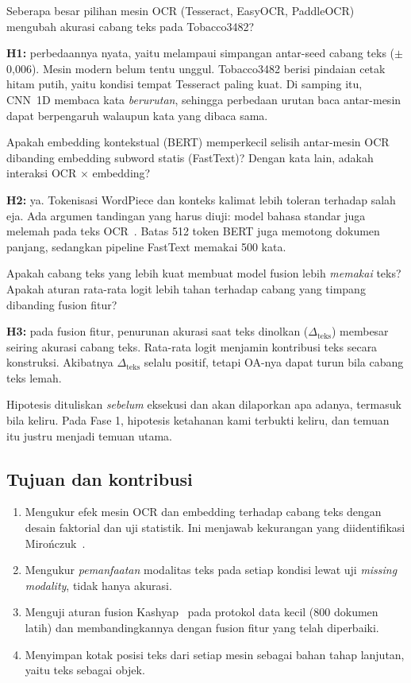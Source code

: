 \documentclass[11pt,a4paper]{article}
\begin{document}
\begin{description}[leftmargin=2.6em,style=nextline]
\item[Q1.] Seberapa besar pilihan mesin OCR (Tesseract, EasyOCR, PaddleOCR) mengubah
akurasi cabang teks pada Tobacco3482?

\textbf{H1:} perbedaannya nyata, yaitu melampaui simpangan antar-seed cabang teks
($\pm$0,006). Mesin modern belum tentu unggul. Tobacco3482 berisi pindaian cetak hitam
putih, yaitu kondisi tempat Tesseract paling kuat. Di samping itu, CNN~1D membaca kata
\emph{berurutan}, sehingga perbedaan urutan baca antar-mesin dapat berpengaruh walaupun
kata yang dibaca sama.

\item[Q2.] Apakah embedding kontekstual (BERT) memperkecil selisih antar-mesin OCR
dibanding embedding subword statis (FastText)? Dengan kata lain, adakah interaksi
OCR $\times$ embedding?

\textbf{H2:} ya. Tokenisasi WordPiece dan konteks kalimat lebih toleran terhadap salah
eja. Ada argumen tandingan yang harus diuji: model bahasa standar juga melemah pada teks
OCR~\cite{michail2025}. Batas 512 token BERT juga memotong dokumen panjang, sedangkan
pipeline FastText memakai 500 kata.

\item[Q3.] Apakah cabang teks yang lebih kuat membuat model fusion lebih
\emph{memakai} teks? Apakah aturan rata-rata logit lebih tahan terhadap cabang yang
timpang dibanding fusion fitur?

\textbf{H3:} pada fusion fitur, penurunan akurasi saat teks dinolkan
($\Delta_\text{teks}$) membesar seiring akurasi cabang teks. Rata-rata logit menjamin
kontribusi teks secara konstruksi. Akibatnya $\Delta_\text{teks}$ selalu positif, tetapi
OA-nya dapat turun bila cabang teks lemah.
\end{description}

Hipotesis dituliskan \emph{sebelum} eksekusi dan akan dilaporkan apa adanya, termasuk
bila keliru. Pada Fase 1, hipotesis ketahanan kami terbukti keliru, dan temuan itu justru
menjadi temuan utama.

\subsection{Tujuan dan kontribusi}

\begin{enumerate}
  \item Mengukur efek mesin OCR dan embedding terhadap cabang teks dengan desain
  faktorial dan uji statistik. Ini menjawab kekurangan yang diidentifikasi
  Miro\'nczuk~\cite{mironczuk2026}.
  \item Mengukur \emph{pemanfaatan} modalitas teks pada setiap kondisi lewat uji
  \textit{missing modality}, tidak hanya akurasi.
  \item Menguji aturan fusion Kashyap~\cite{kashyap2026} pada protokol data kecil
  (800 dokumen latih) dan membandingkannya dengan fusion fitur yang telah diperbaiki.
  \item Menyimpan kotak posisi teks dari setiap mesin sebagai bahan tahap lanjutan,
  yaitu teks sebagai objek.
\end{enumerate}
\end{document}

